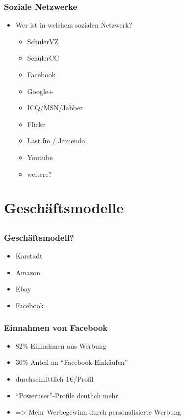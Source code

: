 \documentclass[12pt]{beamer}
\begin{document}
\begin{frame}
  \frametitle{Soziale Netzwerke}
  \begin{itemize}
    \item Wer ist in welchem sozialen Netzwerk?
      \begin{itemize}
        \item SchülerVZ
        \item SchülerCC
        \item Facebook
        \item Google+
        \item ICQ/MSN/Jabber
        \item Flickr
        \item Last.fm / Jamendo
        \item Youtube
        \item weitere?
      \end{itemize}
  \end{itemize}
\end{frame}

\section{Geschäftsmodelle}
\subsection{}

\begin{frame}
  \frametitle{Geschäftsmodell?}
  \begin{itemize}
    \item<2-> Karstadt
    \item<3-> Amazon
    \item<4-> Ebay
    \item<5-> Facebook
  \end{itemize}
\end{frame}

\begin{frame}
  \frametitle{Einnahmen von Facebook}
  \begin{itemize}
    \item<2-> 82\% Einnahmen aus Werbung
    \item<3-> 30\% Anteil an "`Facebook-Einkäufen"'
    \item<4-> durchschnittlich 1€/Profil
    \item<5-> "`Poweruser"'-Profile deutlich mehr
    \item<6-> => Mehr Werbegewinn durch personalisierte Werbung
  \end{itemize}
\end{frame}
\end{document}
